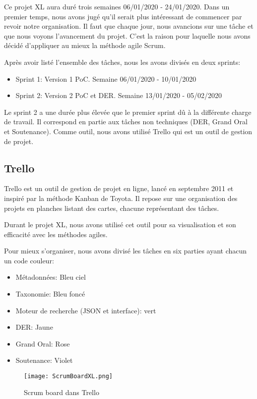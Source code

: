 Ce projet XL aura duré trois semaines 06/01/2020 - 24/01/2020.
Dans un premier temps, nous avons jugé qu'il serait plus intéressant de commencer par revoir notre organisation.
Il faut que chaque jour, nous avancions sur une tâche et que nous voyons l'avancement du projet.
C'est la raison pour laquelle nous avons décidé d'appliquer au mieux la méthode agile Scrum.

Après avoir listé l'ensemble des tâches, nous les avons divisés en deux sprints:

\begin{itemize}
    \item Sprint 1:
    Version 1 PoC.
    Semaine 06/01/2020 - 10/01/2020 
    \item Sprint 2:
    Version 2 PoC et DER\@.
    Semaine 13/01/2020 - 05/02/2020
\end{itemize}

Le sprint 2 a une durée plus élevée que le premier sprint dû à la différente charge de travail.
Il correspond en partie aux tâches non techniques (DER, Grand Oral et Soutenance). 
Comme outil, nous avons utilisé Trello qui est un outil de gestion de projet.  


\subsection{Trello}
Trello est un outil de gestion de projet en ligne, lancé en septembre 2011 et inspiré par la méthode Kanban de Toyota.
Il repose sur une organisation des projets en planches listant des cartes, chacune représentant des tâches. 

Durant le projet XL, nous avons utilisé cet outil pour sa visualisation et son efficacité avec les méthodes agiles. 

Pour mieux s’organiser, nous avons divisé les tâches en six parties ayant chacun un code couleur: 

\begin{itemize}
    \item Métadonnées: Bleu ciel 
    \item Taxonomie: Bleu foncé 
    \item Moteur de recherche (JSON et interface): vert
    \item DER\@: Jaune
    \item Grand Oral: Rose
    \item Soutenance: Violet 
\end{itemize}


\begin{figure}[h!]
  \centering
  \texttt{[image: ScrumBoardXL.png]}
	\caption[]{Scrum board dans Trello}
	\label{}
\end{figure}

